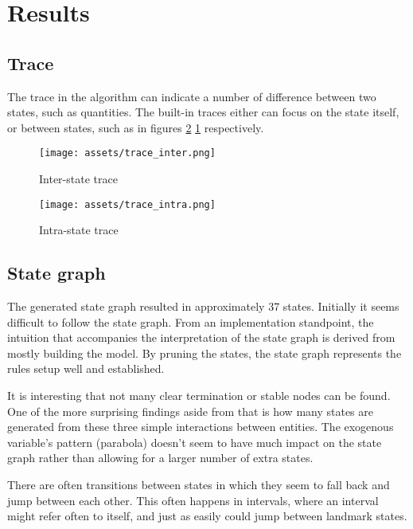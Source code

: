 \section{Results}
\subsection{Trace}
The trace in the algorithm can indicate a number of difference between two
states, such as quantities. The built-in traces either can focus on the state
itself, or between states, such as in figures \ref{fig:trace_intra.png}
\ref{fig:trace_inter.png} respectively.

\begin{figure}
    \texttt{[image: assets/trace\_inter.png]}
    \caption{Inter-state trace}
    \label{fig:trace_inter.png}
\end{figure}

\begin{figure}
    \texttt{[image: assets/trace\_intra.png]}
    \caption{Intra-state trace}
    \label{fig:trace_intra.png}
\end{figure}

\subsection{State graph}
The generated state graph resulted in approximately 37 states. Initially it
seems difficult to follow the state graph. From an implementation standpoint,
the intuition that accompanies the interpretation of the state graph is derived
from mostly building the model. By pruning the states, the state graph
represents the rules setup well and established.

It is interesting that not many clear termination or stable nodes can be found.
One of the more surprising findings aside from that is how many states are
generated from these three simple interactions between entities. The exogenous
variable's pattern (parabola) doesn't seem to have much impact on the state
graph rather than allowing for a larger number of extra states. 

There are often transitions between states in which they seem to fall back and
jump between each other. This often happens in intervals, where an interval
might refer often to itself, and just as easily could jump between landmark
states.